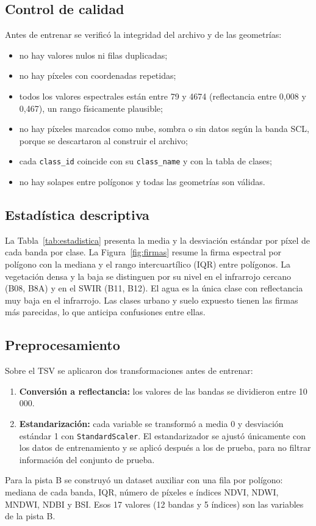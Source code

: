 \documentclass{article}
\begin{document}
\subsection{Control de calidad}
Antes de entrenar se verificó la integridad del archivo y de las geometrías:
\begin{itemize}
 \item no hay valores nulos ni filas duplicadas;
 \item no hay píxeles con coordenadas repetidas;
 \item todos los valores espectrales están entre 79 y 4674 (reflectancia entre 0{,}008 y 0{,}467), un rango físicamente plausible;
 \item no hay píxeles marcados como nube, sombra o sin datos según la banda SCL, porque se descartaron al construir el archivo;
 \item cada \texttt{class\_id} coincide con su \texttt{class\_name} y con la tabla de clases;
 \item no hay solapes entre polígonos y todas las geometrías son válidas.
\end{itemize}

\subsection{Estadística descriptiva}
La Tabla~\ref{tab:estadistica} presenta la media y la desviación estándar por píxel de cada banda por clase. La Figura~\ref{fig:firmas} resume la firma espectral por polígono con la mediana y el rango intercuartílico (IQR) entre polígonos. La vegetación densa y la baja se distinguen por su nivel en el infrarrojo cercano (B08, B8A) y en el SWIR (B11, B12). El agua es la única clase con reflectancia muy baja en el infrarrojo. Las clases urbano y suelo expuesto tienen las firmas más parecidas, lo que anticipa confusiones entre ellas.



\subsection{Preprocesamiento}
Sobre el TSV se aplicaron dos transformaciones antes de entrenar:
\begin{enumerate}
 \item \textbf{Conversión a reflectancia:} los valores de las bandas se dividieron entre 10\,000.
 \item \textbf{Estandarización:} cada variable se transformó a media 0 y desviación estándar 1 con \texttt{StandardScaler}. El estandarizador se ajustó únicamente con los datos de entrenamiento y se aplicó después a los de prueba, para no filtrar información del conjunto de prueba.
\end{enumerate}
Para la pista B se construyó un dataset auxiliar con una fila por polígono: mediana de cada banda, IQR, número de píxeles e índices NDVI, NDWI, MNDWI, NDBI y BSI. Esos 17 valores (12 bandas y 5 índices) son las variables de la pista B.
\end{document}
